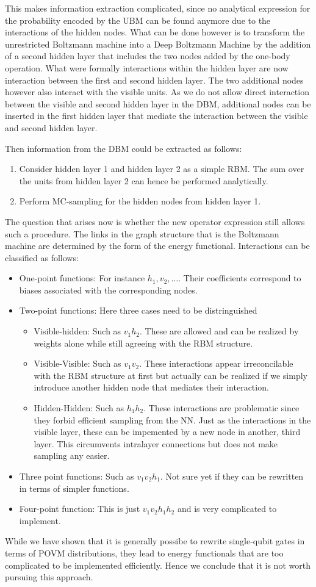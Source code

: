 \documentclass{article}
\begin{document}
This makes information extraction complicated, since no analytical expression
for the probability encoded by the UBM can be found anymore due to the
interactions of the hidden nodes. What can be done however is to transform the
unrestricted Boltzmann machine into a Deep Boltzmann Machine by the addition of
a second hidden layer that includes the two nodes added by the one-body
operation. What were formally interactions within the hidden layer are now
interaction between the first and second hidden layer. The two additional nodes
however also interact with the visible units. As we do not allow direct
interaction between the visible and second hidden layer in the DBM, additional
nodes can be inserted in the first hidden layer that mediate the interaction
between the visible and second hidden layer. \par
Then information from the DBM could be extracted as follows:
\begin{enumerate}
  \item Consider hidden layer 1 and hidden layer 2 as a simple RBM. The sum over
  the units from hidden layer 2 can hence be performed analytically.
  \item Perform MC-sampling for the hidden nodes from hidden layer 1.
\end{enumerate}
The question that arises now is whether the new operator expression still allows
such a procedure. The links in the graph structure that is the Boltzmann machine
are determined by the form of the energy functional. Interactions can be
classified as follows:
\begin{itemize}
  \item One-point functions: For instance $h_1, v_2, \hdots$. Their coefficients
  correspond to biases associated with the corresponding nodes.
  \item Two-point functions: Here three cases need to be distringuished
  \begin{itemize}
    \item Visible-hidden: Such as $v_1h_2$. These are allowed and can be realized
    by weights alone while still agreeing with the RBM structure.
    \item Visible-Visible: Such as $v_1v_2$. These interactions appear
    irreconcilable with the RBM structure at first but actually can be realized
    if we simply introduce another hidden node that mediates their interaction.
    \item Hidden-Hidden: Such as $h_1h_2$. These interactions are problematic
    since they forbid efficient sampling from the NN. Just as the interactions
    in the visible layer, these can be impemented by a new node in another,
    third layer. This circumvents intralayer connections but does not make
    sampling any easier.
  \end{itemize}
  \item Three point functions: Such as $v_1v_2h_1$. Not sure yet if they can be
  rewritten in terms of simpler functions.
  \item Four-point function: This is just $v_1v_2h_1h_2$ and is very complicated
  to implement.
\end{itemize}
While we have shown that it is generally possibe to rewrite single-qubit gates
in terms of POVM distributions, they lead to energy functionals that are too
complicated to be implemented efficiently. Hence we conclude that it is not
worth pursuing this approach.
\end{document}
